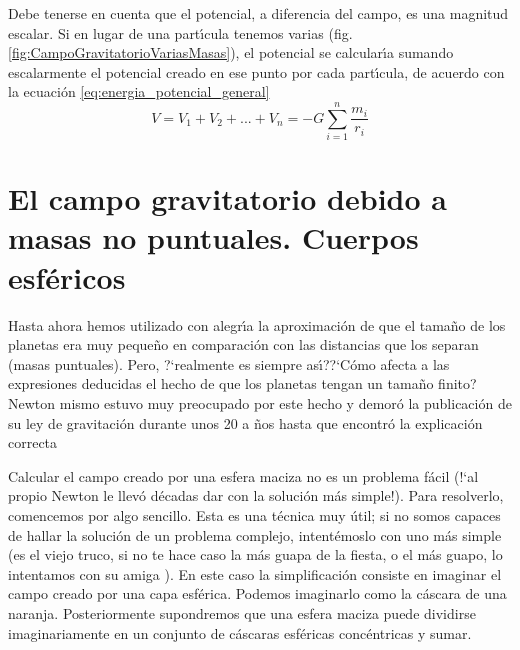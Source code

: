 Debe tenerse en cuenta que el potencial, a diferencia del campo, es una magnitud escalar. Si en lugar de una part\'\i{}cula tenemos varias (fig. \ref{fig:CampoGravitatorioVariasMasas}), el potencial se calcular\'\i{}a sumando escalarmente el potencial creado en ese punto por cada part\'\i{}cula, de acuerdo con la ecuaci\'on \ref{eq:energia_potencial_general}
\begin{equation}
V=V_1+V_2+...+V_n=-G\sum_{i=1}^{n}\frac{m_i}{r_i}
\label{eq:potencial_varias_particulas}
\end{equation}

\section{El campo gravitatorio debido a masas no puntuales. Cuerpos esf\'ericos}

Hasta ahora hemos utilizado con alegr\'\i{}a la aproximaci\'on de que el tama\~no de los planetas era muy peque\~no en comparaci\'on con las distancias que los separan (masas puntuales). Pero, ?`realmente es siempre as\'\i{}??`C\'omo afecta a las expresiones deducidas el hecho de que los planetas tengan un tama\~no finito? Newton mismo estuvo muy preocupado por este hecho y demor\'o la publicaci\'on de su ley de gravitaci\'on durante unos 20 a \~nos hasta que encontr\'o la explicaci\'on correcta 

Calcular el campo creado por una esfera maciza no es un problema f\'acil (!`al propio Newton le llev\'o d\'ecadas dar con la soluci\'on m\'as simple!). Para resolverlo, comencemos por algo sencillo. Esta es una t\'ecnica muy \'util; si no somos capaces de hallar la soluci\'on de un problema complejo, intent\'emoslo con uno m\'as simple (es el viejo truco, si no te hace caso la m\'as guapa de la fiesta, o el m\'as guapo, lo intentamos con su amiga ). En este caso la simplificaci\'on consiste en imaginar el campo creado por una capa esf\'erica\cite{AlonsoFin1986}. Podemos imaginarlo como la c\'ascara de una naranja. Posteriormente supondremos que una esfera maciza puede dividirse imaginariamente en un conjunto de c\'ascaras esf\'ericas conc\'entricas y sumar.

